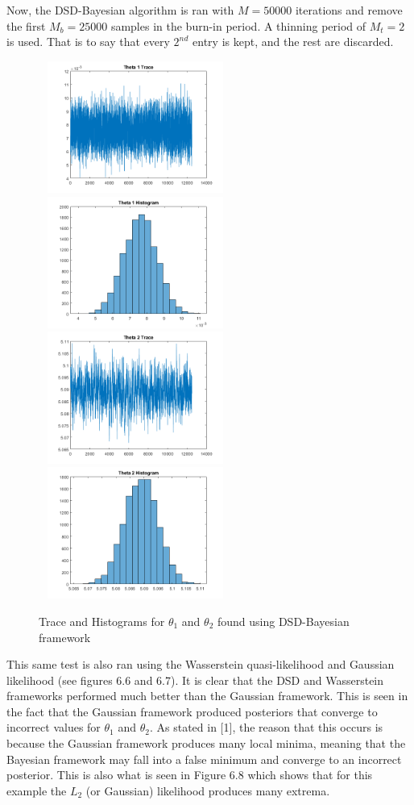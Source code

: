 \documentclass[botnum, fleqn]{unmeethesis}
\begin{document}
\noindent Now, the DSD-Bayesian algorithm is ran with $M=50000$ iterations and remove the first $M_b=25000$ samples in the burn-in period. A thinning period of $M_t=2$ is used. That is to say that every $2^{nd}$ entry is kept, and the rest are discarded.
\begin{figure}[H]
	\centering
	\includegraphics[width=2.5in,height=1.7in]{untitled1.png}
	\includegraphics[width=2.5in,height=1.7in]{untitled2.png}
	\includegraphics[width=2.5in,height=1.7in]{untitled3.png}
	\includegraphics[width=2.5in,height=1.7in]{untitled4.png}
	\caption{Trace and Histograms for $\theta_1$ and $\theta_2$ found using DSD-Bayesian framework}
\end{figure}
\newpage \noindent  This same test is also ran using the Wasserstein quasi-likelihood and Gaussian likelihood (see figures 6.6 and 6.7). It is clear that the DSD and Wasserstein frameworks performed much better than the Gaussian framework. This is seen in the fact that the Gaussian framework produced posteriors that converge to incorrect values for $\theta_1$ and $\theta_2$. As stated in [1], the reason that this occurs is because the Gaussian framework produces many local minima, meaning that the Bayesian framework may fall into a false minimum and converge to an incorrect posterior. This is also what is seen in Figure 6.8 which shows that for this example the $L_2$ (or Gaussian) likelihood produces many extrema. 
\end{document}
